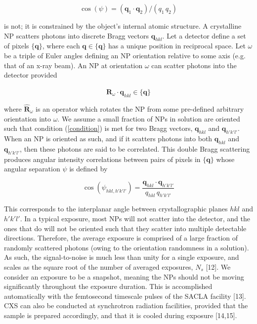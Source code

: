 \documentclass [11pt,fleqn]{article}
\def \be {\begin{equation}}
\def \ee {\end{equation}}
\begin{document}
\be \label{cpsi}
\cos (\psi) = (\bm q_1 \cdot \bm q_2)/(q_1 \, q_2 )
\ee

 is not; it is constrained by the object's internal atomic structure. A crystalline NP scatters photons into discrete Bragg vectors $\bm q_{hkl}$. Let a detector define  a set of pixels $\{\bm q\}$, where each $\bm q \in \{\bm q\}$ has a unique position in reciprocal space. Let $\omega$ be a triple of Euler angles defining an NP orientation relative to some axis (e.g. that of an x-ray beam). An NP at orientation $\omega$ can scatter photons into the detector provided 

\be \label{condition}
\hat{\bm R}_\omega \cdot \bm q_{hkl} \in \{\bm q\}
\ee

where $\hat{\bm R}_\omega$ is an operator which rotates the NP from some pre-defined arbitrary orientation into $\omega$. We assume a small fraction of NPs in solution are oriented such that condition (\ref{condition}) is met for two Bragg vectors, $\bm q_{hkl}$ and $\bm q_{h'k'l'}$. When an NP is oriented as such, and if it scatters photons into both $\bm q_{hkl}$ and $\bm q_{h'k'l'}$, then these photons are said to be correlated. This double Bragg scattering produces angular intensity correlations between pairs of pixels in $\{\bm q\}$ whose angular separation $\psi$ is defined by

\be \label{hklcorr}
\cos(\psi_{hkl,h'k'l'}) =\frac{ \bm q_{hkl} \cdot \bm q_{h'k'l'} } {q_{hkl}\, q_{h'k'l'}} 
\ee

This corresponds to the interplanar angle between crystallographic planes $hkl$ and $h'k'l'$. In a typical exposure, most NPs will not scatter into the detector, and the ones that do will not be oriented such that they scatter into multiple detectable directions. Therefore, the average exposure is comprised of a large fraction of randomly scattered photons (owing to the orientation randomness in  a solution). As such, the signal-to-noise is much less than unity for a single exposure, and scales as the square root of the number of averaged exposures, $N_s$ [12]. We consider an exposure to be a snapshot, meaning the NPs should not be moving significantly throughout the exposure duration. This is accomplished automatically with the femtosecond timescale pulses of the SACLA facility [13].  CXS can also be conducted at synchrotron radiation facilities, provided  that the sample is prepared accordingly, and that it is cooled during exposure [14,15]. 

\end{document}
